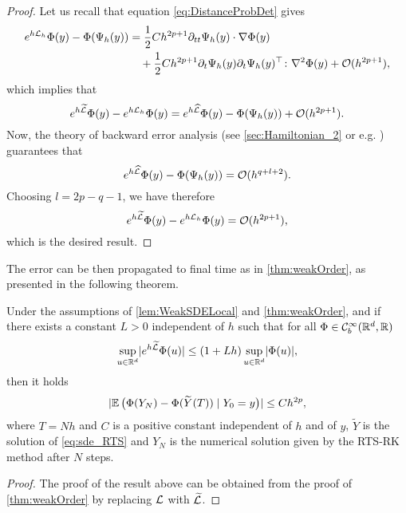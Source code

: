 \documentclass[10pt]{article}
\begin{document}
{\begin{proof}
	Let us recall that equation \eqref{eq:DistanceProbDet} gives
	\begin{equation}
	\begin{aligned}
		e^{h\mathcal{L}_h}\Phi(y) - \Phi(\Psi_h(y)) &= \frac{1}{2} Ch^{2p+1}\partial_{tt}\Psi_h(y) \cdot \nabla\Phi(y)\\
		&\quad +\frac{1}{2}Ch^{2p+1}\partial_t \Psi_h(y) \partial_t \Psi_h(y)^\top  \colon \nabla^2\Phi(y) + \mathcal{O}(h^{2p+1}),
	\end{aligned}
	\end{equation}
	which implies that
	\begin{equation}
		e^{h\widetilde {\mathcal{L}}}\Phi(y)- e^{h\mathcal{L}_h}\Phi(y) = e^{h\widehat {\mathcal{L}}}\Phi(y) - \Phi(\Psi_h(y)) + \mathcal{O}(h^{2p+1}).
	\end{equation}	
	Now, the theory of backward error analysis (see \cref{sec:Hamiltonian_2} or e.g. \cite[Chapter IX]{HLW06}) guarantees that
	\begin{equation}
		e^{h\widehat {\mathcal{L}}}\Phi(y) - \Phi(\Psi_h(y)) = \mathcal{O}(h^{q+l+2}).
	\end{equation}
	Choosing $l = 2p - q - 1$, we have therefore
	\begin{equation}
		e^{h\widetilde {\mathcal{L}}}\Phi(y)- e^{h\mathcal{L}_h}\Phi(y) = \mathcal{O}(h^{2p+1}),
	\end{equation}
	which is the desired result.
\end{proof}
The error can be then propagated to final time as in \cref{thm:weakOrder}, as presented in the following theorem. 
\begin{theorem} Under the assumptions of \cref{lem:WeakSDELocal} and \cref{thm:weakOrder}, and if there exists a constant $L > 0$ independent of $h$ such that for all $\Phi \in \mathcal C^\infty_b(\mathbb{R}^d, \mathbb{R})$ 
	\begin{equation}
		\sup_{u\in\mathbb{R}^d} \lvert e^{h\widetilde {\mathcal{L}}}\Phi(u)\rvert \leq (1 + Lh)\sup_{u\in\mathbb{R}^d}\lvert\Phi(u)\rvert,
	\end{equation}
	then it holds
	\begin{equation}
		\lvert\operatorname{\mathbb{E}}\big(\Phi(Y_N)- \Phi(\widetilde Y(T))\mid Y_0 = y\big)\rvert \leq Ch^{2p},
	\end{equation}
	where $T = Nh$ and $C$ is a positive constant independent of $h$ and of $y$, $\tilde Y$ is the solution of \eqref{eq:sde_RTS} and $Y_N$ is the numerical solution given by the RTS-RK method after $N$ steps.
\end{theorem} 
\begin{proof} The proof of the result above can be obtained from the proof of \cref{thm:weakOrder} by replacing $\mathcal{L}$ with $\widetilde {\mathcal{L}}$.
\end{proof}
}
\end{document}

